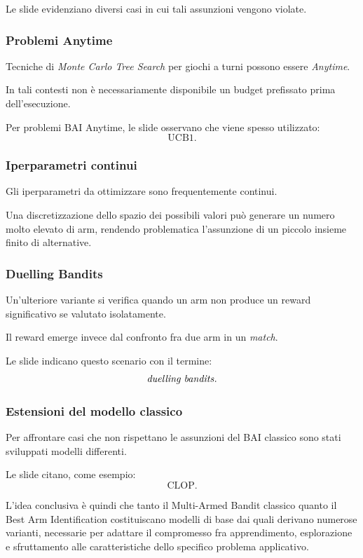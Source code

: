 Le slide evidenziano diversi casi in cui tali assunzioni vengono violate.

\subsubsection{Problemi Anytime}

Tecniche di \emph{Monte Carlo Tree Search} per giochi a turni possono essere \emph{Anytime}.

In tali contesti non è necessariamente disponibile un budget prefissato prima dell'esecuzione.

Per problemi BAI Anytime, le slide osservano che viene spesso utilizzato:
\[
\mathrm{UCB1}.
\]

\subsubsection{Iperparametri continui}

Gli iperparametri da ottimizzare sono frequentemente continui.

Una discretizzazione dello spazio dei possibili valori può generare un numero molto elevato di arm, rendendo problematica l'assunzione di un piccolo insieme finito di alternative.

\subsubsection{Duelling Bandits}

Un'ulteriore variante si verifica quando un arm non produce un reward significativo se valutato isolatamente.

Il reward emerge invece dal confronto fra due arm in un \emph{match}.

Le slide indicano questo scenario con il termine:
\[
\text{\emph{duelling bandits}}.
\]

\subsubsection{Estensioni del modello classico}

Per affrontare casi che non rispettano le assunzioni del BAI classico sono stati sviluppati modelli differenti.

Le slide citano, come esempio:
\[
\mathrm{CLOP}.
\]

L'idea conclusiva è quindi che tanto il Multi-Armed Bandit classico quanto il Best Arm Identification costituiscano modelli di base dai quali derivano numerose varianti, necessarie per adattare il compromesso fra apprendimento, esplorazione e sfruttamento alle caratteristiche dello specifico problema applicativo.